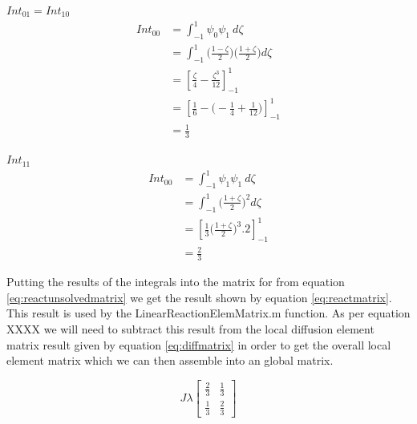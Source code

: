 \documentclass[11pt]{article}
\begin{document}
\underline{$Int_{01} = Int_{10}$} \\

\begin{equation}\label{eq:Int01}
\begin{split}
 Int_{00} &= \int_{-1}^{1} \psi_{0}\psi_{1} \ d \zeta \\
&=  \int_{-1}^{1}  \Big ( \frac{1-\zeta}{2} \Big )  \Big ( \frac{1+\zeta}{2} \Big )d\zeta \\
& = \left[ \frac{\zeta}{4} - \frac{\zeta^3}{12}\right]_{-1}^{1} \\
& = \left[ \frac{1}{6} -  \Big (-\frac{1}{4} + \frac{1}{12} \Big )\right]_{-1}^{1} \\
& = \frac{1}{3}
\end{split}
\end{equation}

\underline{$Int_{11}$} \\
\begin{equation}\label{eq:Int00}
\begin{split}
 Int_{00} &= \int_{-1}^{1} \psi_{1}\psi_{1} \ d \zeta \\
&=  \int_{-1}^{1}  \Big ( \frac{1+\zeta}{2} \Big )^2 d\zeta \\
& = \left[ \frac{1}{3} \Big ( \frac{1+\zeta}{2}\Big)^3 . 2 \right]_{-1}^{1} \\
& = \frac{2}{3}
\end{split}
\end{equation}

Putting the results of the integrals into the matrix for from equation \ref{eq:reactunsolvedmatrix} we get the result shown by equation \ref{eq:reactmatrix}. This result is used by the LinearReactionElemMatrix.m function. As per equation XXXX we will need to subtract this result from the local diffusion element matrix result given by equation \ref{eq:diffmatrix} in order to get the overall local element matrix which we can then assemble into an global matrix.

\begin{equation} \label{eq:reactmatrix}
J\lambda
\begin{bmatrix}

\frac{2}{3} & \frac{1}{3}  \\[1ex]
 \frac{1}{3}  & \frac{2}{3}
\end{bmatrix}
\end{equation}


\end{document}
